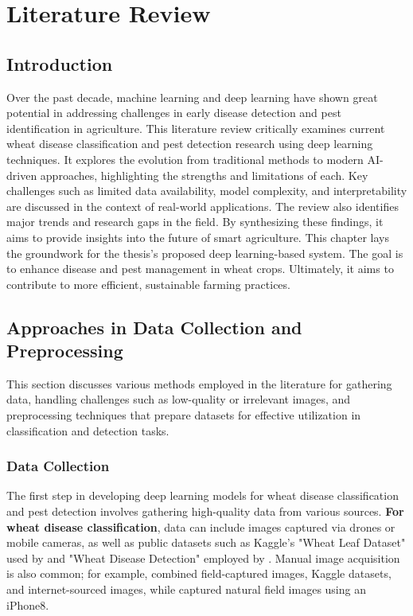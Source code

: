\chapter{Literature Review}

\section{Introduction}
Over the past decade, machine learning and deep learning have shown great potential in addressing challenges in early disease detection and pest identification in agriculture. This literature review critically examines current wheat disease classification and pest detection research using deep learning techniques. It explores the evolution from traditional methods to modern AI-driven approaches, highlighting the strengths and limitations of each. Key challenges such as limited data availability, model complexity, and interpretability are discussed in the context of real-world applications. The review also identifies major trends and research gaps in the field. By synthesizing these findings, it aims to provide insights into the future of smart agriculture. This chapter lays the groundwork for the thesis’s proposed deep learning-based system. The goal is to enhance disease and pest management in wheat crops. Ultimately, it aims to contribute to more efficient, sustainable farming practices.

\section{Approaches in Data Collection and Preprocessing }
This section discusses various methods employed in the literature for gathering data, handling challenges such as low-quality or irrelevant images, and preprocessing techniques that prepare datasets for effective utilization in classification and detection tasks.
\subsection{Data Collection}
The first step in developing deep learning models for wheat disease classification and pest detection involves gathering high-quality data from various sources. \textbf{For wheat disease classification}, data can include images captured via drones or mobile cameras, as well as public datasets such as Kaggle's "Wheat Leaf Dataset" used by \parencite{ ramadan2024improving} and "Wheat Disease Detection" employed by \parencite{reis2024integrated}. Manual image acquisition is also common; for example, \parencite{hassan2024wheat} combined field-captured images, Kaggle datasets, and internet-sourced images, while \parencite{onler2024wheat} captured natural field images using an iPhone8.

